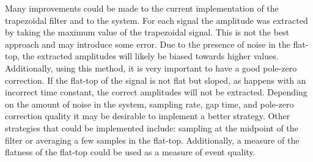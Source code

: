 
Many improvements could be made to the current implementation of the trapezoidal filter and to the system. For each signal the amplitude was extracted by taking the maximum value of the trapezoidal signal. This is not the best approach and may introduce some error. Due to the presence of noise in the flat-top, the extracted amplitudes will likely be biased towards higher values. Additionally, using this method, it is very important to have a good pole-zero correction. If the flat-top of the signal is not flat but sloped, as happens with an incorrect time constant, the correct amplitudes will not be extracted. Depending on the amount of noise in the system, sampling rate, gap time, and pole-zero correction quality it may be desirable to implement a better strategy. Other strategies that could be implemented include: sampling at the midpoint of the filter or averaging a few samples in the flat-top. Additionally, a measure of the flatness of the flat-top could be used as a measure of event quality.

